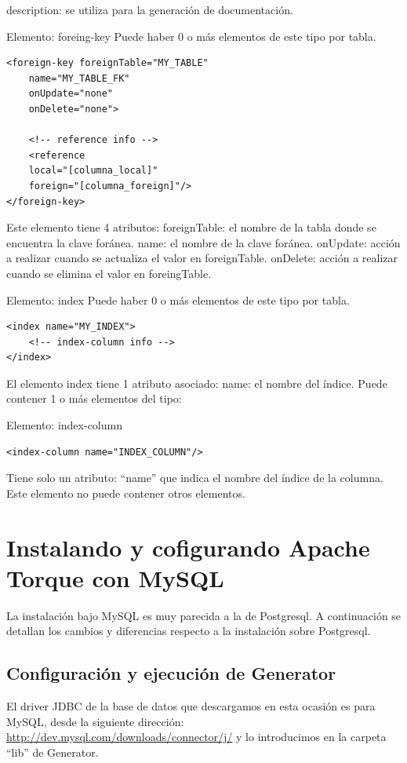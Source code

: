 \documentclass[12pt, oneside]{article}
\begin{document}
description: se utiliza para la generación de documentación.


Elemento: foreing-key
Puede haber 0 o más elementos de este tipo por tabla.

\begin{lstlisting}
<foreign-key foreignTable="MY_TABLE"
	name="MY_TABLE_FK"
	onUpdate="none"
	onDelete="none">
	
	<!-- reference info -->
	<reference
	local="[columna_local]"
	foreign="[columna_foreign]"/>
</foreign-key>
\end{lstlisting}

Este elemento tiene 4 atributos:
foreignTable: el nombre de la tabla donde se encuentra la clave foránea.
name: el nombre de la clave foránea.
onUpdate: acción a realizar cuando se actualiza el valor en foreignTable.
onDelete: acción a realizar cuando se elimina el valor en foreingTable.

Elemento: index
Puede haber 0 o más elementos de este tipo por tabla.

\begin{lstlisting}
<index name="MY_INDEX">
	<!-- index-column info -->
</index>
\end{lstlisting}

El elemento index tiene 1 atributo asociado:
name: el nombre del índice. 
Puede contener 1 o más elementos  del tipo:
	
Elemento: index-column

\begin{lstlisting}
<index-column name="INDEX_COLUMN"/>
\end{lstlisting}

Tiene solo un atributo: “name” que indica el nombre del índice de la columna. Este elemento no puede contener otros elementos.

\section{Instalando y cofigurando Apache Torque con MySQL}
La instalación bajo MySQL es muy parecida a la de Postgresql. A continuación se detallan los cambios y diferencias respecto a la instalación sobre Postgresql.

\subsection{Configuración y ejecución de Generator}
El driver JDBC de la base de datos que descargamos en esta ocasión es para MySQL, desde la siguiente dirección: \url{http://dev.mysql.com/downloads/connector/j/} y lo introducimos en la carpeta “lib” de Generator.
\end{document}
